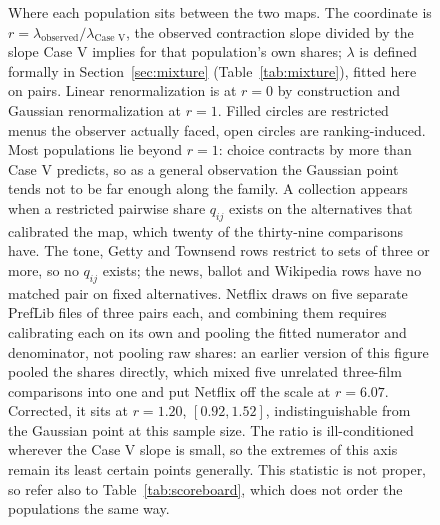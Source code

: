 \documentclass[11pt]{article}
\begin{document}
\begin{figure}[H]
\caption{Where each population sits between the two maps. The coordinate is
$r = \lambda_{\text{observed}} / \lambda_{\text{Case V}}$, the observed contraction slope
divided by the slope Case V implies for that population's own shares; $\lambda$ is defined
formally in Section~\ref{sec:mixture} (Table~\ref{tab:mixture}), fitted here on pairs. Linear
renormalization is at $r = 0$ by construction and Gaussian renormalization at $r = 1$. Filled
circles are
restricted menus the observer actually faced, open circles are ranking-induced. Most populations
lie beyond $r = 1$: choice contracts by more than Case V predicts, so as a general observation
the Gaussian point tends not to be far enough along the family. A collection appears when a
restricted pairwise share $q_{ij}$ exists on the alternatives that calibrated the map, which
twenty of the thirty-nine comparisons have. The tone, Getty and Townsend rows restrict to sets of
three or more, so no $q_{ij}$ exists; the news, ballot and Wikipedia rows have no matched pair on
fixed alternatives. Netflix draws on five separate PrefLib files of three pairs each, and
combining them requires calibrating each on its own and pooling the fitted numerator and
denominator, not pooling raw shares: an earlier version of this figure pooled the shares
directly, which mixed five unrelated three-film comparisons into one and put Netflix off the
scale at $r = 6.07$. Corrected, it sits at $r = 1.20$, $[0.92, 1.52]$, indistinguishable from the
Gaussian point at this sample size. The ratio is ill-conditioned wherever the Case V slope is
small, so the extremes of this axis remain its least certain points generally. This statistic is
not proper, so refer also to Table~\ref{tab:scoreboard}, which does not order the populations
the same way.}
\label{fig:line}
\end{figure}
\end{document}

